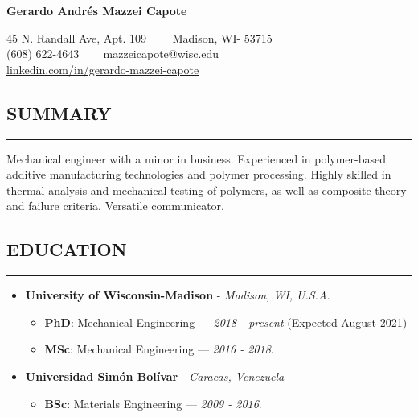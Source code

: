 \documentclass[11pt,letterpaper]{article}
\newenvironment{indentsection}[1]%
{\begin{list}{}%
	{\setlength{\leftmargin}{#1}}%
	\item[]%
}
{\end{list}}
\begin{document}
	\thispagestyle{firststyle}

	
\begin{center}
	{\LARGE \textbf{Gerardo Andrés Mazzei Capote}}

	45 N. Randall Ave, Apt. 109\ \ \textbullet
	\ \ Madison, WI- 53715
	\\
	(608) 622-4643 \ \textbullet
	\ \ mazzeicapote@wisc.edu\\
	\href{https://www.linkedin.com/in/gerardo-mazzei-capote}{linkedin.com/in/gerardo-mazzei-capote}
	
\end{center}

\vspace{-1em}

\subsection*{SUMMARY}
	\vspace{-0.5em}
	\hrule
	\vspace{0.4em}
	\begin{indentsection}{\parindent}
	Mechanical engineer with a minor in business. Experienced in polymer-based additive manufacturing technologies and polymer processing. Highly skilled in thermal analysis and mechanical testing of polymers, as well as composite theory and failure criteria. Versatile communicator.
	\end{indentsection}


\subsection*{EDUCATION}
	\vspace{-0.5em}
	\hrule
	\vspace{0.4em}
	\begin{itemize}
	\item
	\textbf{University of Wisconsin-Madison} - \emph{Madison, WI, U.S.A.}
	\begin{itemize}	
	\item
	\textbf{PhD}: Mechanical Engineering --- \emph{2018 - present} (Expected August 2021) 
	\item
	\textbf{MSc}: Mechanical Engineering --- \emph{2016 - 2018}. 
\end{itemize}

	\item
	\textbf{Universidad Simón Bolívar} - \emph{Caracas, Venezuela}
	\begin{itemize}	
		\item
		\textbf{BSc}: Materials Engineering --- \emph{2009 - 2016}. 
	\end{itemize}
	\end{itemize}
\end{document}
